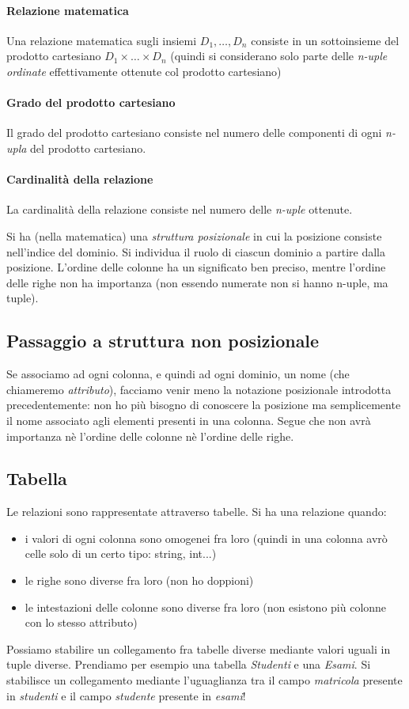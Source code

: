 \paragraph{Relazione matematica}
Una relazione matematica sugli insiemi $D_1,\dots,D_n$ consiste in un sottoinsieme del prodotto cartesiano $D_1 \times \dots \times D_n$ (quindi si considerano solo parte delle \emph{n-uple ordinate} effettivamente ottenute col prodotto cartesiano)
\paragraph{Grado del prodotto cartesiano}
Il grado del prodotto cartesiano consiste nel numero delle componenti di ogni \emph{n-upla} del prodotto cartesiano.
\paragraph{Cardinalità della relazione}
La cardinalità della relazione consiste nel numero delle \emph{n-uple} ottenute.

\noindent Si ha (nella matematica) una \emph{struttura posizionale} in cui la posizione consiste nell'indice del dominio. Si individua il ruolo di ciascun dominio a partire dalla posizione. L'ordine delle colonne ha un significato ben preciso, mentre l'ordine delle righe non ha importanza (non essendo numerate non si hanno n-uple, ma tuple).
\subsection{Passaggio a struttura non posizionale}
Se associamo ad ogni colonna, e quindi ad ogni dominio, un nome (che chiameremo \emph{attributo}), facciamo venir meno la notazione posizionale introdotta precedentemente: non ho più bisogno di conoscere la posizione ma semplicemente il nome associato agli elementi presenti in una colonna. Segue che non avrà importanza nè l'ordine delle colonne nè l'ordine delle righe.

\subsection{Tabella}
Le relazioni sono rappresentate attraverso tabelle. Si ha una relazione quando:
\begin{itemize}
	\item i valori di ogni colonna sono omogenei fra loro (quindi in una colonna avrò celle solo di un certo tipo: string, int...)
	\item le righe sono diverse fra loro (non ho doppioni)
	\item le intestazioni delle colonne sono diverse fra loro (non esistono più colonne con lo stesso attributo)
\end{itemize}
Possiamo stabilire un collegamento fra tabelle diverse mediante valori uguali in tuple diverse. Prendiamo per esempio una tabella \emph{Studenti} e una \emph{Esami}. Si stabilisce un collegamento mediante l'uguaglianza tra il campo \emph{matricola} presente in \emph{studenti} e il campo \emph{studente} presente in \emph{esami}!

